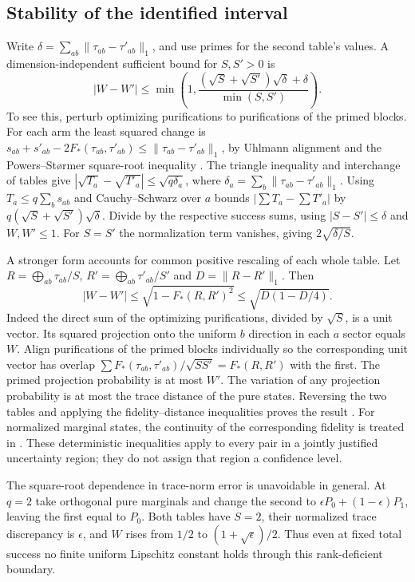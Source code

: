 \documentclass[11pt,letterpaper]{article}
\begin{document}
\subsection*{Stability of the identified interval}
Write $\delta=\sum_{ab}\|\tau_{ab}-\tau'_{ab}\|_1$, and use primes for the second table's values. A dimension-independent sufficient bound for $S,S'>0$ is
\[
 |W-W'|\le\min\!\left(1,\frac{(\sqrt S+\sqrt{S'})\sqrt\delta+\delta}{\min(S,S')}\right).
\]
To see this, perturb optimizing purifications to purifications of the primed blocks. For each arm the least squared change is $s_{ab}+s'_{ab}-2F_*(\tau_{ab},\tau'_{ab})\le\|\tau_{ab}-\tau'_{ab}\|_1$, by Uhlmann alignment and the Powers--Størmer square-root inequality \cite{powers,watrous}. The triangle inequality and interchange of tables give $|\sqrt{T_a}-\sqrt{T'_a}|\le\sqrt{q\delta_a}$, where $\delta_a=\sum_b\|\tau_{ab}-\tau'_{ab}\|_1$. Using $T_a\le q\sum_b s_{ab}$ and Cauchy--Schwarz over $a$ bounds $|\sum T_a-\sum T'_a|$ by $q(\sqrt S+\sqrt{S'})\sqrt\delta$. Divide by the respective success sums, using $|S-S'|\le\delta$ and $W,W'\le1$. For $S=S'$ the normalization term vanishes, giving $2\sqrt{\delta/S}$.

A stronger form accounts for common positive rescaling of each whole table. Let $R=\bigoplus_{ab}\tau_{ab}/S$, $R'=\bigoplus_{ab}\tau'_{ab}/S'$ and $D=\|R-R'\|_1$. Then
\[
 |W-W'|\le\sqrt{1-F_*(R,R')^2}\le\sqrt{D(1-D/4)} .
\]
Indeed the direct sum of the optimizing purifications, divided by $\sqrt S$, is a unit vector. Its squared projection onto the uniform $b$ direction in each $a$ sector equals $W$. Align purifications of the primed blocks individually so the corresponding unit vector has overlap $\sum F_*(\tau_{ab},\tau'_{ab})/\sqrt{SS'}=F_*(R,R')$ with the first. The primed projection probability is at most $W'$. The variation of any projection probability is at most the trace distance of the pure states. Reversing the two tables and applying the fidelity--distance inequalities proves the result \cite[Thm.~3.33]{watrous}. For normalized marginal states, the continuity of the corresponding fidelity is treated in \cite[Cor.~5.14]{multi}. These deterministic inequalities apply to every pair in a jointly justified uncertainty region; they do not assign that region a confidence level.

The square-root dependence in trace-norm error is unavoidable in general. At $q=2$ take orthogonal pure marginals and change the second to $\epsilon P_0+(1-\epsilon)P_1$, leaving the first equal to $P_0$. Both tables have $S=2$, their normalized trace discrepancy is $\epsilon$, and $W$ rises from $1/2$ to $(1+\sqrt\epsilon)/2$. Thus even at fixed total success no finite uniform Lipschitz constant holds through this rank-deficient boundary.
\end{document}
